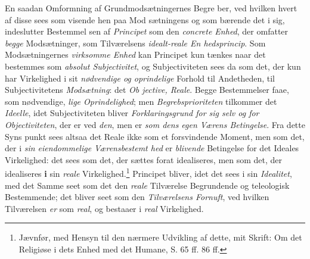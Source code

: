 En saadan Omformning af Grundmodsætningernes Begre\-%
ber, ved hvilken hvert af disse sees som visende hen paa Mod\-%
sætningens og som bærende det i sig, indeslutter Bestemmel\-%
sen af \emph{Principet} som den \emph{concrete Enhed}, der omfatter
\emph{begge} Modsætninger, som Tilværelsens \emph{idealt-reale En\-%
hedsprincip}. Som Modsætningernes \emph{virksomme Enhed}
kan Principet kun tænkes naar det bestemmes som \emph{absolut
Subjectivitet}, og Subjectiviteten sees da som det, der kun
har Virkelighed i sit \emph{nødvendige og oprindelige} Forhold
til Andetheden, til Subjectivitetens \emph{Modsætning}: det \emph{Ob\-%
jective, Reale}. Begge Bestemmelser faae, som nødvendige,
\emph{lige Oprindelighed}; men \emph{Begrebsprioriteten} tilkommer
det \emph{Ideelle}, idet Subjectiviteten bliver \emph{Forklaringsgrund
for sig selv og for Objectiviteten}, der er ved \emph{den}, men
er \emph{som dens egen Værens Betingelse}. Fra dette Syns\-%
punkt sees altsaa det Reale ikke som et forsvindende Moment,
men som det, der i \emph{sin eiendommelige Værensbestemt\-%
hed} er \emph{blivende} Betingelse for det Ideales Virkelighed: det
sees som det, der sættes forat idealiseres, men som det, der
idealiseres \textbf{i} sin \emph{reale} Virkelighed.\footnote{Jævnfør, med Hensyn til den nærmere Udvikling af dette, mit Skrift:
Om det Religiøse i dets Enhed med det Humane, S. 65 ff. 86 ff.} Principet bliver, idet det
sees i sin \emph{Idealitet}, med det Samme seet som det den
\emph{reale} Tilværelse Begrundende og teleologisk Bestemmende;
det bliver seet som den \emph{Tilværelsens Fornuft}, ved hvilken
Tilværelsen \emph{er} som \emph{real}, og bestaaer i \emph{real} Virkelighed.

